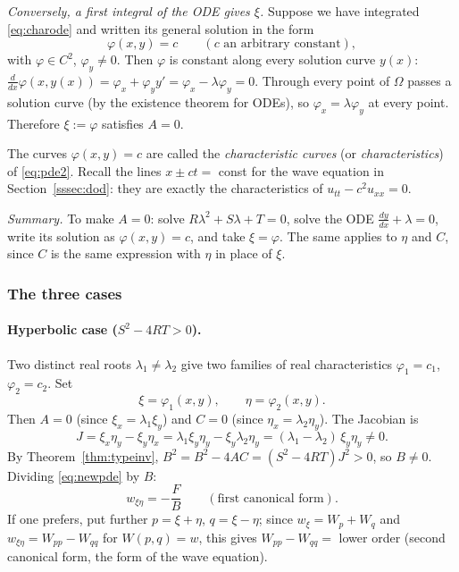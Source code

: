 \documentclass[11pt]{article}
\theoremstyle{plain}
\theoremstyle{definition}
\theoremstyle{remark}
\begin{document}
\emph{Conversely, a first integral of the ODE gives $\xi$.} Suppose we have integrated \eqref{eq:charode} and written its general solution in the form
$$ \varphi(x,y) = c \qquad (c \text{ an arbitrary constant}), $$
with $\varphi \in C^2$, $\varphi_y \neq 0$. Then $\varphi$ is constant along every solution curve $y(x)$: $\frac{d}{dx}\varphi(x,y(x)) = \varphi_x + \varphi_y y' = \varphi_x - \lambda\varphi_y = 0$. Through every point of $\Omega$ passes a solution curve (by the existence theorem for ODEs), so $\varphi_x = \lambda\varphi_y$ at every point. Therefore $\xi := \varphi$ satisfies $A = 0$.

The curves $\varphi(x,y) = c$ are called the \emph{characteristic curves} (or \emph{characteristics}) of \eqref{eq:pde2}. Recall the lines $x \pm ct = $ const for the wave equation in Section~\ref{sssec:dod}: they are exactly the characteristics of $u_{tt} - c^2u_{xx} = 0$.

\emph{Summary.} To make $A = 0$: solve $R\lambda^2 + S\lambda + T = 0$, solve the ODE $\frac{dy}{dx} + \lambda = 0$, write its solution as $\varphi(x,y) = c$, and take $\xi = \varphi$. The same applies to $\eta$ and $C$, since $C$ is the same expression with $\eta$ in place of $\xi$.

\subsubsection{The three cases}

\paragraph{Hyperbolic case ($S^2 - 4RT > 0$).} Two distinct real roots $\lambda_1 \ne \lambda_2$ give two families of real characteristics $\varphi_1 = c_1$, $\varphi_2 = c_2$. Set
$$ \xi = \varphi_1(x,y), \qquad \eta = \varphi_2(x,y). $$
Then $A = 0$ (since $\xi_x = \lambda_1\xi_y$) and $C = 0$ (since $\eta_x = \lambda_2\eta_y$). The Jacobian is
$$ J = \xi_x\eta_y - \xi_y\eta_x = \lambda_1\xi_y\eta_y - \xi_y\lambda_2\eta_y = (\lambda_1 - \lambda_2)\,\xi_y\eta_y \neq 0. $$
By Theorem~\ref{thm:typeinv}, $B^2 = B^2 - 4AC = (S^2 - 4RT)J^2 > 0$, so $B \neq 0$. Dividing \eqref{eq:newpde} by $B$:
$$ w_{\xi\eta} = -\frac{F}{B} \qquad (\text{first canonical form}). $$
If one prefers, put further $p = \xi + \eta$, $q = \xi - \eta$; since $w_\xi = W_p + W_q$ and $w_{\xi\eta} = W_{pp} - W_{qq}$ for $W(p,q) = w$, this gives $W_{pp} - W_{qq} = $ lower order (second canonical form, the form of the wave equation).
\end{document}
